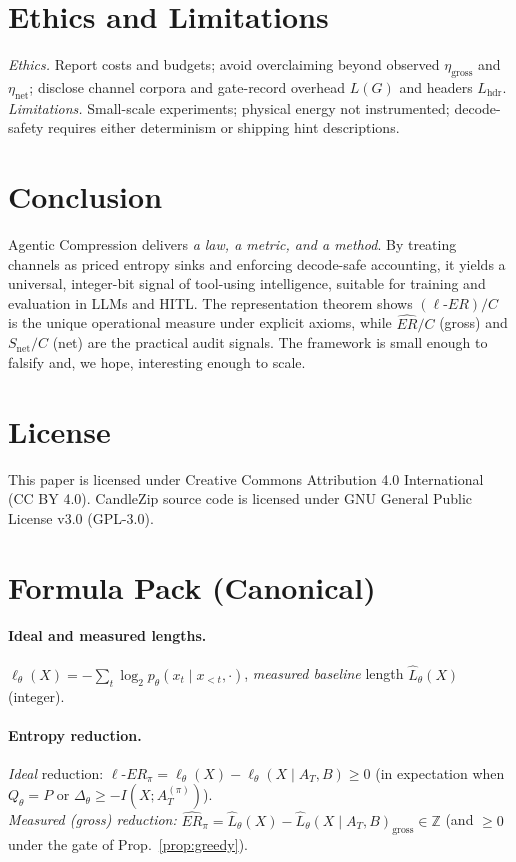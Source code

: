 \documentclass[12pt,a4paper]{article}
\newcommand{\ERideal}{\ell\text{-}ER}
\begin{document}
\section{Ethics and Limitations}
\emph{Ethics.} Report costs and budgets; avoid overclaiming beyond observed $\eta_{\text{gross}}$ and $\eta_{\text{net}}$; disclose channel corpora and gate-record overhead $L(G)$ and headers $L_{\mathrm{hdr}}$. \emph{Limitations.} Small-scale experiments; physical energy not instrumented; decode-safety requires either determinism or shipping hint descriptions.

\section{Conclusion}
Agentic Compression delivers \emph{a law, a metric, and a method}. By treating channels as priced entropy sinks and enforcing decode-safe accounting, it yields a universal, integer-bit signal of tool-using intelligence, suitable for training and evaluation in LLMs and HITL. The representation theorem shows $(\ERideal)/C$ is the unique operational measure under explicit axioms, while $\widehat{ER}/C$ (gross) and $S_{\text{net}}/C$ (net) are the practical audit signals. The framework is small enough to falsify and, we hope, interesting enough to scale.

\section{License}
This paper is licensed under Creative Commons Attribution 4.0 International (CC BY 4.0). CandleZip source code is licensed under GNU General Public License v3.0 (GPL-3.0).

\appendix

\section{Formula Pack (Canonical)}
\label{app:formulas}
\paragraph{Ideal and measured lengths.}
$\ell_\theta(X) = -\sum_t \log_2 p_\theta(x_t\mid x_{<t},\cdot)$,\quad 
\emph{measured baseline} length $\widehat{L}_\theta(X)$ (integer).\\
\paragraph{Entropy reduction.}
\emph{Ideal} reduction: $\ERideal_\pi = \ell_\theta(X)-\ell_\theta(X\mid A_T,B)\ge 0$ (in expectation when $Q_\theta=P$ or $\Delta_\theta\ge -I(X;A_T^{(\pi)})$).\\
\emph{Measured (gross) reduction:} $\widehat{ER}_\pi = \widehat{L}_\theta(X)-\widehat{L}_\theta(X\mid A_T,B)_{\mathrm{gross}}\in\mathbb{Z}$ (and $\ge 0$ under the gate of Prop.~\ref{prop:greedy}).\\
\end{document}
